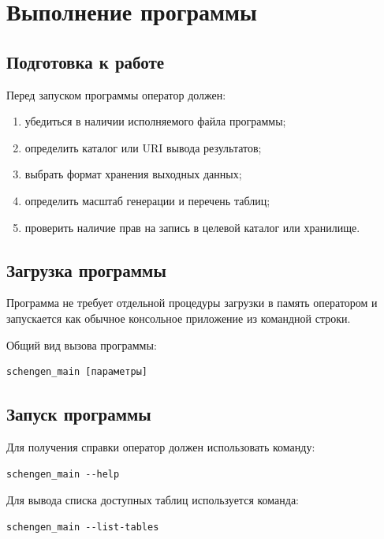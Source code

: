 \section{Выполнение программы}

\subsection{Подготовка к работе}

Перед запуском программы оператор должен:
\begin{enumerate}
    \item убедиться в наличии исполняемого файла программы;
    \item определить каталог или URI вывода результатов;
    \item выбрать формат хранения выходных данных;
    \item определить масштаб генерации и перечень таблиц;
    \item проверить наличие прав на запись в целевой каталог или хранилище.
\end{enumerate}

\subsection{Загрузка программы}

Программа не требует отдельной процедуры загрузки в память оператором и
запускается как обычное консольное приложение из командной строки.

Общий вид вызова программы:

\begin{verbatim}
schengen_main [параметры]
\end{verbatim}

\subsection{Запуск программы}

Для получения справки оператор должен использовать команду:

\begin{verbatim}
schengen_main --help
\end{verbatim}

Для вывода списка доступных таблиц используется команда:

\begin{verbatim}
schengen_main --list-tables
\end{verbatim}

